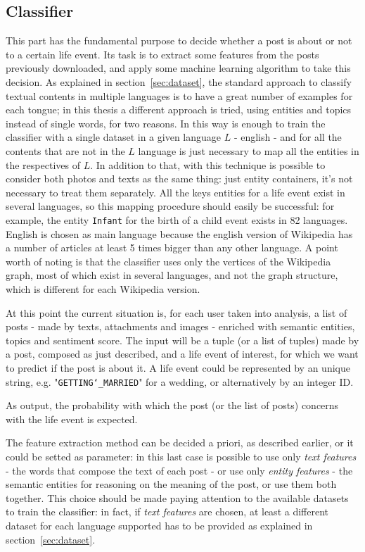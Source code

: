 \subsection{Classifier}
This part has the fundamental purpose to decide whether a post is about or not to a certain life event. Its task is to extract some features from the posts previously downloaded, and apply some machine learning algorithm to take this decision. As explained in section~\ref{sec:dataset}, the standard approach to classify textual contents in multiple languages is to have a great number of examples for each tongue; in this thesis a different approach is tried, using entities and topics instead of single words, for two reasons. In this way is enough to train the classifier with a single dataset in a given language $ L $ - english - and for all the contents that are not in the $ L $ language is just necessary to map all the entities in the respectives of $L$. In addition to that, with this technique is possible to consider both photos and texts as the same thing: just entity containers, it's not necessary to treat them separately. All the keys entities for a life event exist in several languages, so this mapping procedure should easily be successful: for example, the entity \texttt{Infant} for the birth of a child event exists in 82 languages. English is chosen as main language because the english version of Wikipedia has a number of articles at least 5 times bigger than any other language. A point worth of noting is that the classifier uses only the vertices of the Wikipedia graph, most of which exist in several languages, and not the graph structure, which is different for each Wikipedia version.

At this point the current situation is, for each user taken into analysis, a list of posts - made by texts, attachments and images - enriched with semantic entities, topics and sentiment score. The input will be a tuple (or a list of tuples) made by a post, composed as just described, and a life event of interest, for which we want to predict if the post is about it. A life event could be represented by an unique string, e.g. "\texttt{GETTING\char`_MARRIED}" for a wedding, or alternatively by an integer ID.

As output, the probability with which the post (or the list of posts) concerns with the life event is expected.

The feature extraction method can be decided a priori, as described earlier, or it could be setted as parameter: in this last case is possible to use only \emph{text features} - the words that compose the text of each post - or use only \emph{entity features} - the semantic entities for reasoning on the meaning of the post, or use them both together. This choice should be made paying attention to the available datasets to train the classifier: in fact, if \emph{text features} are chosen, at least a different dataset for each language supported has to be provided as explained in section~\ref{sec:dataset}.

